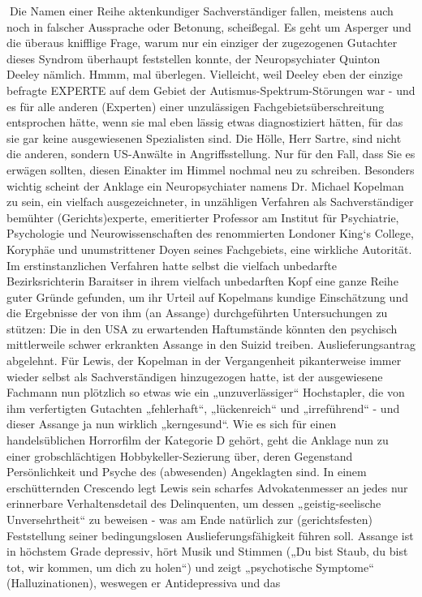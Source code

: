 \begin{multicols}{2}
Die Namen einer Reihe aktenkundiger Sachverständiger fallen, meistens auch noch in falscher Aussprache
oder Betonung, scheißegal. Es geht um Asperger und
die überaus knifflige Frage, warum nur ein einziger der
zugezogenen Gutachter dieses Syndrom überhaupt feststellen konnte, der Neuropsychiater Quinton Deeley
nämlich. Hmmm, mal überlegen. Vielleicht, weil Deeley
eben der einzige befragte EXPERTE auf dem Gebiet der
Autismus-Spektrum-Störungen war - und es für alle anderen (Experten) einer unzulässigen Fachgebietsüberschreitung entsprochen hätte, wenn sie mal eben lässig
etwas diagnostiziert hätten, für das sie gar keine ausgewiesenen Spezialisten sind. Die Hölle, Herr Sartre, sind
nicht die anderen, sondern US-Anwälte in Angriffsstellung. Nur für den Fall, dass Sie es erwägen sollten, diesen
Einakter im Himmel nochmal neu zu schreiben.
Besonders wichtig scheint der Anklage ein Neuropsychiater namens Dr. Michael Kopelman zu sein, ein vielfach ausgezeichneter, in unzähligen Verfahren als Sachverständiger bemühter (Gerichts)experte, emeritierter
Professor am Institut für Psychiatrie, Psychologie und
Neurowissenschaften des renommierten Londoner
King‘s College, Koryphäe und unumstrittener Doyen
seines Fachgebiets, eine wirkliche Autorität. Im erstinstanzlichen Verfahren hatte selbst die vielfach unbedarfte
Bezirksrichterin Baraitser in ihrem vielfach unbedarften
Kopf eine ganze Reihe guter Gründe gefunden, um ihr
Urteil auf Kopelmans kundige Einschätzung und die Ergebnisse der von ihm (an Assange) durchgeführten Untersuchungen zu stützen: Die in den USA zu erwartenden Haftumstände könnten den psychisch mittlerweile
schwer erkrankten Assange in den Suizid treiben. Auslieferungsantrag abgelehnt.
Für Lewis, der Kopelman in der Vergangenheit pikanterweise immer wieder selbst als Sachverständigen
hinzugezogen hatte, ist der ausgewiesene Fachmann
nun plötzlich so etwas wie ein „unzuverlässiger“ Hochstapler, die von ihm verfertigten Gutachten „fehlerhaft“,
„lückenreich“ und „irreführend“ - und dieser Assange ja
nun wirklich „kerngesund“.
Wie es sich für einen handelsüblichen Horrorfilm der
Kategorie D gehört, geht die Anklage nun zu einer grobschlächtigen Hobbykeller-Sezierung über, deren Gegenstand Persönlichkeit und Psyche des (abwesenden) Angeklagten sind. In einem erschütternden Crescendo legt
Lewis sein scharfes Advokatenmesser an jedes nur erinnerbare Verhaltensdetail des Delinquenten, um dessen
„geistig-seelische Unversehrtheit“ zu beweisen - was am
Ende natürlich zur (gerichtsfesten) Feststellung seiner
bedingungslosen Auslieferungsfähigkeit führen soll.
Assange ist in höchstem Grade depressiv, hört Musik
und Stimmen („Du bist Staub, du bist tot, wir kommen,
um dich zu holen“) und zeigt „psychotische Symptome“
(Halluzinationen), weswegen er Antidepressiva und das


\end{multicols}
